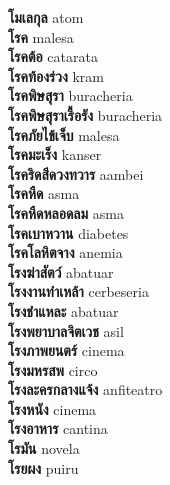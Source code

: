 \textbf{ โมเลกุล  } atom \\
\textbf{ โรค  } malesa \\
\textbf{ โรคต้อ  } catarata \\
\textbf{ โรคท้องร่วง  } kram \\
\textbf{ โรคพิษสุรา  } buracheria \\
\textbf{ โรคพิษสุราเรื้อรัง  } buracheria \\
\textbf{ โรคภัยไข้เจ็บ  } malesa \\
\textbf{ โรคมะเร็ง  } kanser \\
\textbf{ โรคริดสีดวงทวาร  } aambei \\
\textbf{ โรคหืด  } asma \\
\textbf{ โรคหืดหลอดลม  } asma \\
\textbf{ โรคเบาหวาน  } diabetes \\
\textbf{ โรคโลหิตจาง  } anemia \\
\textbf{ โรงฆ่าสัตว์  } abatuar \\
\textbf{ โรงงานทำเหล้า  } cerbeseria \\
\textbf{ โรงชำแหละ  } abatuar \\
\textbf{ โรงพยาบาลจิตเวช  } asil \\
\textbf{ โรงภาพยนตร์  } cinema \\
\textbf{ โรงมหรสพ  } circo \\
\textbf{ โรงละครกลางแจ้ง  } anfiteatro \\
\textbf{ โรงหนัง  } cinema \\
\textbf{ โรงอาหาร  } cantina \\
\textbf{ โรมัน  } novela \\
\textbf{ โรยผง  } puiru \\
